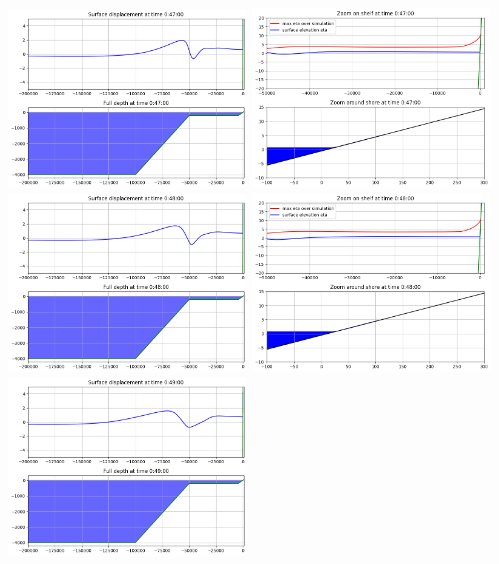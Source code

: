 \documentclass[11pt]{article}
\begin{document}
\vskip 10pt 
\includegraphics[width=0.475\textwidth]{frame0047fig0.png}
\includegraphics[width=0.475\textwidth]{frame0047fig1.png}
\vskip 10pt 
\includegraphics[width=0.475\textwidth]{frame0048fig0.png}
\includegraphics[width=0.475\textwidth]{frame0048fig1.png}
\vskip 10pt 
\includegraphics[width=0.475\textwidth]{frame0049fig0.png}
\end{document}
